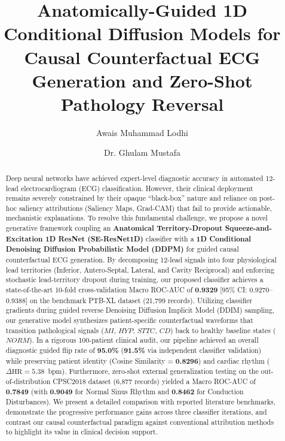 \documentclass[12pt]{elsarticle}
\begin{document}
\begin{frontmatter}

\title{Anatomically-Guided 1D Conditional Diffusion Models for Causal Counterfactual ECG Generation and Zero-Shot Pathology Reversal}

\author[1]{Awais Muhammad Lodhi}
\author[1]{Dr. Ghulam Mustafa}

\address[1]{Department of Computer Science, FOIT\&CS, UCP, Pakistan}

\begin{abstract}
Deep neural networks have achieved expert-level diagnostic accuracy in automated 12-lead electrocardiogram (ECG) classification. However, their clinical deployment remains severely constrained by their opaque ``black-box'' nature and reliance on post-hoc saliency attributions (Saliency Maps, Grad-CAM) that fail to provide actionable, mechanistic explanations. To resolve this fundamental challenge, we propose a novel generative framework coupling an \textbf{Anatomical Territory-Dropout Squeeze-and-Excitation 1D ResNet (SE-ResNet1D)} classifier with a \textbf{1D Conditional Denoising Diffusion Probabilistic Model (DDPM)} for guided causal counterfactual ECG generation. By decomposing 12-lead signals into four physiological lead territories (Inferior, Antero-Septal, Lateral, and Cavity Reciprocal) and enforcing stochastic lead-territory dropout during training, our proposed classifier achieves a state-of-the-art 10-fold cross-validation Macro ROC-AUC of \textbf{0.9329} [95\% CI: 0.9270--0.9388] on the benchmark PTB-XL dataset (21,799 records). Utilizing classifier gradients during guided reverse Denoising Diffusion Implicit Model (DDIM) sampling, our generative model synthesizes patient-specific counterfactual waveforms that transition pathological signals ($MI$, $HYP$, $STTC$, $CD$) back to healthy baseline states ($NORM$). In a rigorous 100-patient clinical audit, our pipeline achieved an overall diagnostic guided flip rate of \textbf{95.0\%} (\textbf{91.5\%} via independent classifier validation) while preserving patient identity (Cosine Similarity = \textbf{0.8296}) and cardiac rhythm ($\Delta\text{HR} = 5.38$~bpm). Furthermore, zero-shot external generalization testing on the out-of-distribution CPSC2018 dataset (6,877 records) yielded a Macro ROC-AUC of \textbf{0.7849} (with \textbf{0.9049} for Normal Sinus Rhythm and \textbf{0.8462} for Conduction Disturbances). We present a detailed comparison with reported literature benchmarks, demonstrate the progressive performance gains across three classifier iterations, and contrast our causal counterfactual paradigm against conventional attribution methods to highlight its value in clinical decision support.
\end{abstract}


\end{frontmatter}
\end{document}
